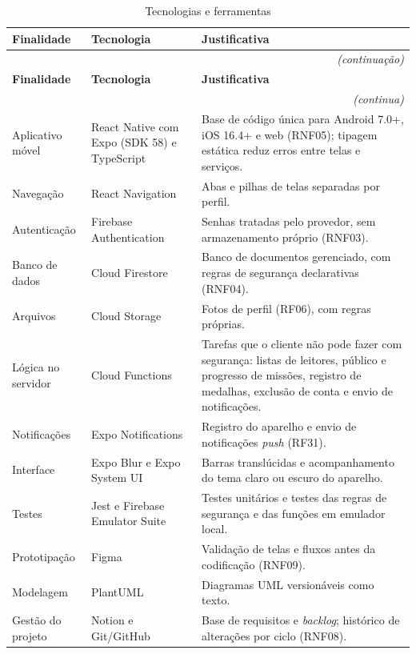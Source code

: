 \begin{quadrolongo}
\begin{longtable}{|p{3.2cm}|p{4.0cm}|p{6.0cm}|}
  \caption{Tecnologias e ferramentas}\label{qua:tecnologias}\\
  \hline
  \textbf{Finalidade} & \textbf{Tecnologia} & \textbf{Justificativa} \\ \hline
\endfirsthead
  \multicolumn{3}{r}{\textit{(continuação)}}\\
  \hline
  \textbf{Finalidade} & \textbf{Tecnologia} & \textbf{Justificativa} \\ \hline
\endhead
  \multicolumn{3}{r}{\textit{(continua)}}\\
\endfoot
\endlastfoot
    Aplicativo móvel & React Native com Expo (SDK 58) e TypeScript & Base de código única para Android 7.0+, iOS 16.4+ e web (RNF05); tipagem estática reduz erros entre telas e serviços. \\ \hline
    Navegação & React Navigation & Abas e pilhas de telas separadas por perfil. \\ \hline
    Autenticação & Firebase Authentication & Senhas tratadas pelo provedor, sem armazenamento próprio (RNF03). \\ \hline
    Banco de dados & Cloud Firestore & Banco de documentos gerenciado, com regras de segurança declarativas (RNF04). \\ \hline
    Arquivos & Cloud Storage & Fotos de perfil (RF06), com regras próprias. \\ \hline
    Lógica no servidor & Cloud Functions & Tarefas que o cliente não pode fazer com segurança: listas de leitores, público e progresso de missões, registro de medalhas, exclusão de conta e envio de notificações. \\ \hline
    Notificações & Expo Notifications & Registro do aparelho e envio de notificações \textit{push} (RF31). \\ \hline
    Interface & Expo Blur e Expo System UI & Barras translúcidas e acompanhamento do tema claro ou escuro do aparelho. \\ \hline
    Testes & Jest e Firebase Emulator Suite & Testes unitários e testes das regras de segurança e das funções em emulador local. \\ \hline
    Prototipação & Figma & Validação de telas e fluxos antes da codificação (RNF09). \\ \hline
    Modelagem & PlantUML & Diagramas UML versionáveis como texto. \\ \hline
    Gestão do projeto & Notion e Git/GitHub & Base de requisitos e \textit{backlog}; histórico de alterações por ciclo (RNF08). \\ \hline

\end{longtable}
\end{quadrolongo}
